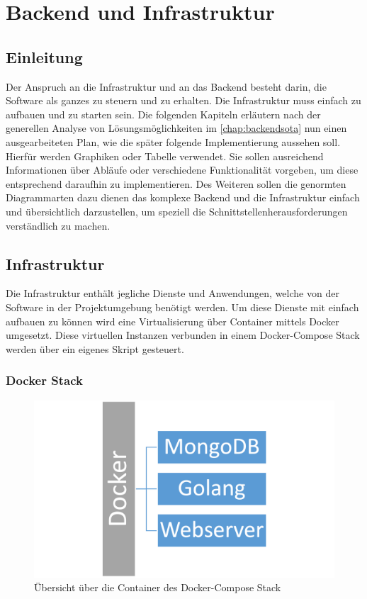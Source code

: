 
\section{Backend und Infrastruktur}
\subsection{Einleitung}
Der Anspruch an die Infrastruktur und an das Backend besteht darin, die Software als ganzes zu steuern und zu erhalten. Die Infrastruktur muss einfach zu aufbauen und zu starten sein. Die folgenden Kapiteln erläutern nach der generellen Analyse von Lösungsmöglichkeiten im \autoref{chap:backendsota} nun einen ausgearbeiteten Plan, wie die später folgende Implementierung aussehen soll. Hierfür werden Graphiken oder Tabelle verwendet. Sie sollen ausreichend Informationen über Abläufe oder verschiedene Funktionalität vorgeben, um diese entsprechend daraufhin zu implementieren. Des Weiteren sollen die genormten Diagrammarten dazu dienen das komplexe Backend und die Infrastruktur einfach und übersichtlich darzustellen, um speziell die Schnittstellenherausforderungen verständlich zu machen.
\subsection{Infrastruktur}
Die Infrastruktur enthält jegliche Dienste und Anwendungen, welche von der Software in der Projektumgebung benötigt werden. Um diese Dienste mit einfach aufbauen zu können wird eine Virtualisierung über Container mittels Docker umgesetzt. Diese virtuellen Instanzen verbunden in einem Docker-Compose Stack werden über ein eigenes Skript gesteuert.
\subsubsection{Docker Stack}
\begin{figure}[H]
	\centering
	\includegraphics[width=\linewidth]{images/mbeier_konzept/docker-stack}
	\caption[Docker-Compose Stack]{Übersicht über die Container des Docker-Compose Stack}
	\label{fig:docker-stack}
\end{figure}

